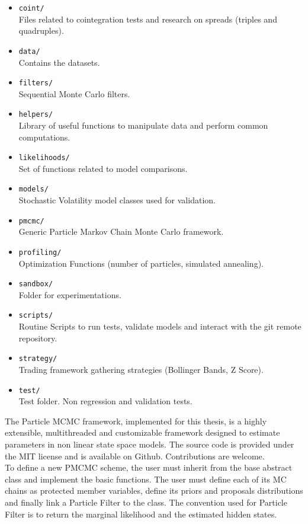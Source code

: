 \documentclass[11pt,a4,twosided,singlespacing,titlepagenumber=on]{scrreprt}
\numberwithin{equation}{chapter} %
\theoremstyle{remark}
\begin{document}
\begin{itemize}
\item \texttt{coint/} \\
Files related to cointegration tests and research on spreads (triples and quadruples).
\item \texttt{data/} \\
Contains the datasets.
\item \texttt{filters/} \\
Sequential Monte Carlo filters.
\item \texttt{helpers/} \\
Library of useful functions to manipulate data and perform common computations.
\item \texttt{likelihoods/} \\
Set of functions related to model comparisons.
\item \texttt{models/} \\
Stochastic Volatility model classes used for validation.
\item \texttt{pmcmc/} \\
Generic Particle Markov Chain Monte Carlo framework.
\item \texttt{profiling/} \\
Optimization Functions (number of particles, simulated annealing).
\item \texttt{sandbox/} \\
Folder for experimentations.
\item \texttt{scripts/} \\
Routine Scripts to run tests, validate models and interact with the git remote repository.
\item \texttt{strategy/} \\
Trading framework gathering strategies (Bollinger Bands, Z Score).
\item \texttt{test/} \\
Test folder. Non regression and validation tests.
\end{itemize}

The Particle MCMC framework, implemented for this thesis, is a highly extensible, multithreaded and customizable framework designed to estimate parameters in non linear state space models. The source code is provided under the MIT license and is available on Github. Contributions are welcome. \\

To define a new PMCMC scheme, the user must inherit from the base abstract class and implement the basic functions. The user must define each of its MC chains as protected member variables, define its priors and proposals distributions and finally link a Particle Filter to the class. The convention used for Particle Filter is to return the marginal likelihood and the estimated hidden states.
\end{document}
